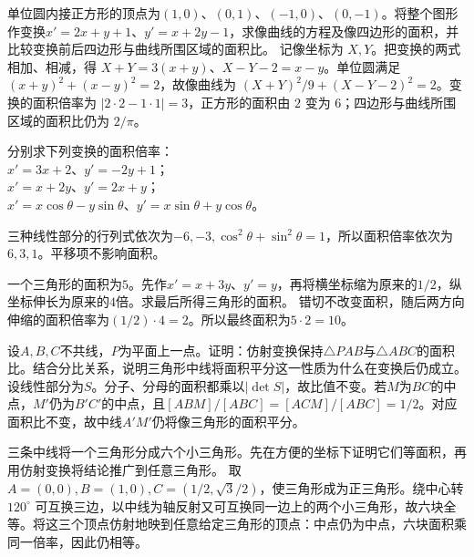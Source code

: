 单位圆内接正方形的顶点为\((1,0)\)、\((0,1)\)、\((-1,0)\)、\((0,-1)\)。将整个图形作变换\(x'=2x+y+1\)、\(y'=x+2y-1\)，求像曲线的方程及像四边形的面积，并比较变换前后四边形与曲线所围区域的面积比。
\solutionanswer
记像坐标为 \(X,Y\)。把变换的两式相加、相减，得 \(X+Y=3(x+y)\)、\(X-Y-2=x-y\)。单位圆满足 \((x+y)^2+(x-y)^2=2\)，故像曲线为 \((X+Y)^2/9+(X-Y-2)^2=2\)。变换的面积倍率为 \(|2\cdot2-1\cdot1|=3\)，正方形的面积由 \(2\) 变为 \(6\)；四边形与曲线所围区域的面积比仍为 \(2/\pi\)。


分别求下列变换的面积倍率：\\
\(x'=3x+2\)、\(y'=-2y+1\)；\\
\(x'=x+2y\)、\(y'=2x+y\)；\\
\(x'=x\cos\theta-y\sin\theta\)、\(y'=x\sin\theta+y\cos\theta\)。
\par
\solutionanswer
三种线性部分的行列式依次为\(-6,-3,\cos^2\theta+\sin^2\theta=1\)，所以面积倍率依次为\(6,3,1\)。平移项不影响面积。


一个三角形的面积为\(5\)。先作\(x'=x+3y\)、\(y'=y\)，再将横坐标缩为原来的\(1/2\)，纵坐标伸长为原来的\(4\)倍。求最后所得三角形的面积。
\solutionanswer
错切不改变面积，随后两方向伸缩的面积倍率为\((1/2)\cdot4=2\)。所以最终面积为\(5\cdot2=10\)。


设\(A,B,C\)不共线，\(P\)为平面上一点。证明：仿射变换保持\(\triangle PAB\)与\(\triangle ABC\)的面积比。结合分比关系，说明三角形中线将面积平分这一性质为什么在变换后仍成立。
\solutionanswer
设线性部分为\(S\)。分子、分母的面积都乘以\(|\det S|\)，故比值不变。若\(M\)为\(BC\)的中点，\(M'\)仍为\(B'C'\)的中点，且\([ABM]/[ABC]=[ACM]/[ABC]=1/2\)。对应面积比不变，故中线\(A'M'\)仍将像三角形的面积平分。


三条中线将一个三角形分成六个小三角形。先在方便的坐标下证明它们等面积，再用仿射变换将结论推广到任意三角形。
\solutionanswer
取 \(A=(0,0),B=(1,0),C=(1/2,\sqrt3/2)\)，使三角形成为正三角形。绕中心转 \(120^\circ\) 可互换三边，以中线为轴反射又可互换同一边上的两个小三角形，故六块全等。将这三个顶点仿射地映到任意给定三角形的顶点：中点仍为中点，六块面积乘同一倍率，因此仍相等。


